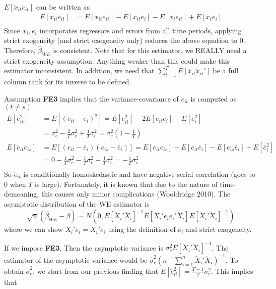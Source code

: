 \documentclass[12pt]{article}
\theoremstyle{definition}
\theoremstyle{property}
\theoremstyle{assumption}
\theoremstyle{example}
\theoremstyle{comment}
\begin{document}
$E[\ddot{x}_{it}\ddot{e}_{it}]$ can be written as
\[
\begin{aligned}
E[\ddot{x}_{it}\ddot{e}_{it}]&=E[x_{it}e_{it}]-E[x_{it}\bar{e}_i]-E[\bar{x}_ie_{it}]+E[\bar{x}_i\bar{e}_i]\\
\end{aligned}
\] Since $\bar{x}_i, \bar{e}_i$ incorporates regressors and errors from all time periods, applying strict exogeneity (and strict exogeneity only) reduces the above equation to 0. Therefore, $\hat{\beta}_{WE}$ is consistent. Note that for this estimator, we REALLY need a strict exogeneity assumption. Anything weaker than this could make this estimator inconsistent. In addition, we need that $\sum_{t=1}^T E\left[\ddot{x}_{it}\ddot{x}_{it}'\right]$ be a full column rank for its inverse to be defined. 
\par
Assumption \textbf{FE3} implies that the variance-covariance of $\ddot{e}_{it}$ is computed as $(t\neq s)$
\[
\begin{aligned}
E[\ddot{e}_{it}^2]&=E[(e_{it}-\bar{e}_i)^2]=E[e_{it}^2]-2E[e_{it}\bar{e}_i]+E[\bar{e}_i^2]\\
&=\sigma_e^2-\frac{2}{T}\sigma_e^2+\frac{1}{T}\sigma_e^2=\sigma_e^2\left(1-\frac{1}{T}\right)\\
E[\ddot{e}_{it}\ddot{e}_{is}]&=E[(e_{it}-\bar{e}_i)(e_{is}-\bar{e}_i)]=E[e_{it}e_{is}]-E[e_{it}\bar{e}_i]-E[e_{is}\bar{e}_i]+E[\bar{e}_i^2]\\
&=0-\frac{1}{T}\sigma_e^2-\frac{1}{T}\sigma_e^2+\frac{1}{T}\sigma_e^2=-\frac{1}{T}\sigma_e^2\\
\end{aligned}
\]
So $\ddot{e}_{it}$ is conditionally homoskedastic and have negative serial correlation (goes to 0 when $T$ is large). Fortunately, it is known that due to the nature of time-demeaning, this causes only minor complications (Wooldridge 2010). The asymptotic distribution of the WE estimator is
\[
\sqrt{n}(\hat{\beta}_{WE}-\beta)\sim N(0,E[\ddot{X}_i'\ddot{X}_i]^{-1}E[\ddot{X}_i'e_{i}e_{i}'\ddot{X}_i]E[\ddot{X}_i'\ddot{X}_i]^{-1})
\]
where we can show $\ddot{X}_i'e_{i}=\ddot{X}_i'\ddot{e}_{i}$ using the definition of $\ddot{e}_i$ and strict exogeneity.
\par
If we impose \textbf{FE3}, Then the asymptotic variance is $\sigma_e^2E[\ddot{X}_i'\ddot{X}_i]^{-1}$. The estimator of the asymptotic variance would be $\widehat{\sigma}_e^2\left(n^{-1}\sum_{i=1}^n \ddot{X}_i'\ddot{X}_i\right)^{-1}$. To obtain $\widehat{\sigma}_e^2$, we start from our previous finding that $E[\ddot{e}_{it}^2]=\frac{T-1}{T}\sigma_e^2$. This implies that
\end{document}
